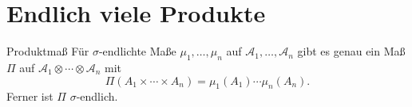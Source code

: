\section*{Endlich viele Produkte}

\begin{karte}{Produktmaß}
    Für \(\sigma\)-endlichte Maße \( \mu_1, \ldots, \mu_n \) auf 
    \( \mathcal{A}_1, \ldots, \mathcal{A}_n \) gibt es genau ein Maß 
    \(\Pi\) auf \( \mathcal{A}_1 \otimes \cdots \otimes \mathcal{A}_n \)
    mit 
    \[ \Pi(A_1\times \cdots \times A_n) = \mu_1(A_1) \cdots \mu_n(A_n). \]
    Ferner ist \( \Pi \) \(\sigma\)-endlich.
\end{karte}